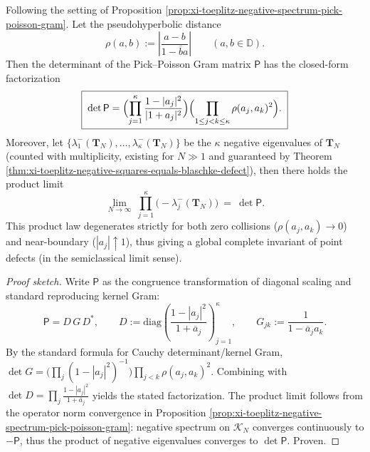 \begin{proposition}\label{prop:xi-pick-poisson-det-factorization}
Following the setting of Proposition \ref{prop:xi-toeplitz-negative-spectrum-pick-poisson-gram}.
Let the pseudohyperbolic distance
\[
\rho(a,b):=\left|\frac{a-b}{1-\overline b a}\right|\qquad(a,b\in\mathbb{D}).
\]
Then the determinant of the Pick--Poisson Gram matrix \(\mathsf P\) has the closed-form factorization
\[
\boxed{\;
\det\mathsf P
=\Bigl(\prod_{j=1}^{\kappa}\frac{1-|a_j|^2}{|1+a_j|^2}\Bigr)
\Bigl(\prod_{1\le j<k\le\kappa}\rho(a_j,a_k)^2\Bigr).\;}
\]
Moreover, let \(\{\lambda_1^-(\mathbf{T}_N),\dots,\lambda_\kappa^-(\mathbf{T}_N)\}\) be the \(\kappa\) negative eigenvalues of \(\mathbf{T}_N\) (counted with multiplicity, existing for \(N\gg 1\) and guaranteed by Theorem \ref{thm:xi-toeplitz-negative-squares-equals-blaschke-defect}), then there holds the product limit
\[
\boxed{\;
\lim_{N\to\infty}\ \prod_{j=1}^{\kappa}\bigl(-\lambda_j^{-}(\mathbf{T}_N)\bigr)\ =\ \det\mathsf P. \;}
\]
This product law degenerates strictly for both zero collisions (\(\rho(a_j,a_k)\to 0\)) and near-boundary (\(|a_j|\uparrow 1\)), thus giving a global complete invariant of point defects (in the semiclassical limit sense).
\end{proposition}
\begin{proof}[Proof sketch]
Write \(\mathsf P\) as the congruence transformation of diagonal scaling and standard reproducing kernel Gram:
\[
\mathsf P
=D\,G\,D^\ast,
\qquad
D:=\mathrm{diag}\!\left(\frac{1-|a_j|^2}{1+\overline a_j}\right)_{j=1}^{\kappa},
\qquad
G_{jk}:=\frac{1}{1-\overline a_j a_k}.
\]
By the standard formula for Cauchy determinant/kernel Gram, \(\det G=\bigl(\prod_j(1-|a_j|^2)^{-1}\bigr)\prod_{j<k}\rho(a_j,a_k)^2\).
Combining with \(\det D=\prod_j\frac{1-|a_j|^2}{1+\overline a_j}\) yields the stated factorization.
The product limit follows from the operator norm convergence in Proposition \ref{prop:xi-toeplitz-negative-spectrum-pick-poisson-gram}: negative spectrum on \(\mathcal K_N\) converges continuously to \(-\mathsf P\), thus the product of negative eigenvalues converges to \(\det\mathsf P\). Proven.
\end{proof}

